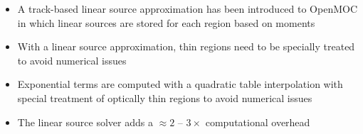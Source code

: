 \vfill
\begin{highlightsbox}[frametitle=Highlights]
\begin{itemize}
\item A track-based linear source approximation has been introduced to OpenMOC in which linear sources are stored for each region based on moments



\item With a linear source approximation, thin regions need to be specially treated to avoid numerical issues

\item Exponential terms are computed with a quadratic table interpolation with special treatment of optically thin regions to avoid numerical issues

\item The linear source solver adds a $\approx 2$ -- $3\times$ computational overhead

\end{itemize}
\end{highlightsbox}
\vfill
